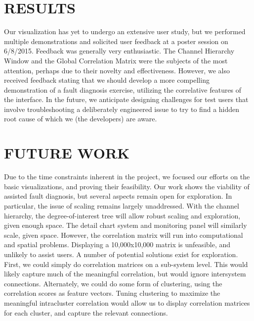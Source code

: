 \documentclass[letterpaper, 10 pt, conference]{ieeeconf}  %
\begin{document}
\section{RESULTS}

Our visualization has yet to undergo an extensive user study, but we performed multiple demonstrations and solicited user feedback at a poster session on 6/8/2015. Feedback was generally very enthusiastic. The Channel Hierarchy Window and the Global Correlation Matrix were the subjects of the most attention, perhaps due to their novelty and effectiveness. However, we also received feedback stating that we should develop a more compelling demonstration of a fault diagnosis exercise, utilizing the correlative features of the interface. In the future, we anticipate designing challenges for test users that involve troubleshooting a deliberately engineered issue to try to find a hidden root cause of which we (the developers) are aware.

\section{FUTURE WORK}

Due to the time constraints inherent in the project, we focused our efforts on the basic visualizations, and proving their feasibility. Our work shows the viability of assisted fault diagnosis, but several aspects remain open for exploration. In particular, the issue of scaling remains largely unaddressed. With the channel hierarchy, the degree-of-interest tree will allow robust scaling and exploration, given enough space. The detail chart system and monitoring panel will similarly scale, given space. However, the correlation matrix will run into computational and spatial problems. Displaying a 10,000x10,000 matrix is unfeasible, and unlikely to assist users. A number of potential solutions exist for exploration. First, we could simply do correlation matrices on a sub-system level. This would likely capture much of the meaningful correlation, but would ignore intersystem connections. Alternately, we could do some form of clustering, using the correlation scores as feature vectors. Tuning clustering to maximize the meaningful intracluster correlation would allow us to display correlation matrices for each cluster, and capture the relevant connections.
\end{document}
